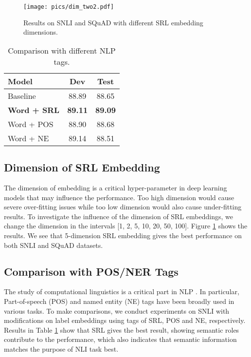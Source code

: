 \documentclass[11pt]{article}
\begin{document}
\begin{figure}
	\centering
	\texttt{[image: pics/dim\_two2.pdf]}
	\caption{\label{fig:squad_dim} Results on SNLI and SQuAD with different SRL embedding dimensions. }
\end{figure}




\begin{table}
	\centering
	{
		\begin{tabular}{l c c}
			\hline
			
			\hline
			Model& Dev & Test\\
			\hline
			Baseline &   88.89   &  88.65  \\
			\hline
			\textbf{Word + SRL} &\textbf{89.11} & \textbf{89.09} \\
			Word + POS & 88.90 &  88.68 \\	
			Word + NE & 89.14 &  88.51 \\
			\hline
			
			\hline
		\end{tabular}
	}
	
	\caption{\label{tab:snli_comp} Comparison with different NLP tags. }
\end{table}

\subsection{Dimension of SRL Embedding}
The dimension of embedding is a critical hyper-parameter in deep learning models that may influence the performance. Too high dimension would cause severe over-fitting issues while too low dimension would also cause under-fitting results. To investigate the influence of the dimension of SRL embeddings, we change the dimension in the intervals [1, 2, 5, 10, 20, 50, 100]. Figure \ref{fig:squad_dim} shows the results. We see that 5-dimension SRL embedding gives the best performance on both SNLI and SQuAD datasets. 

\subsection{Comparison with POS/NER Tags}

The study of computational linguistics is a critical part in NLP \citep{zhou2019head,li-etal-2018-joint-learning}. In particular, Part-of-speech (POS) and named entity (NE) tags have been broadly used in various tasks. To make comparisons, we conduct experiments on SNLI with modifications on label embeddings using tags of SRL, POS and NE, respectively. Results in Table \ref{tab:snli_comp} show that SRL gives the best result, showing semantic roles contribute to the performance, which also indicates that semantic information matches the purpose of NLI task best.
\end{document}
